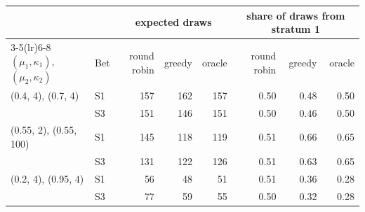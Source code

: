 \begin{tabular}{llrrrrrr}
\toprule
 & & \multicolumn{3}{c}{expected draws} & \multicolumn{3}{c}{share of draws from stratum 1}\\
\cmidrule(lr){3-5}\cmidrule(lr){6-8}
$(\mu_1,\kappa_1)$, $(\mu_2,\kappa_2)$ & Bet & round robin & greedy & oracle & round robin & greedy & oracle\\
\midrule
(0.4, 4), (0.7, 4) & S1 & 157 & 162 & 157 & 0.50 & 0.48 & 0.50\\
 & S3 & 151 & 146 & 151 & 0.50 & 0.46 & 0.50\\
\addlinespace
(0.55, 2), (0.55, 100) & S1 & 145 & 118 & 119 & 0.51 & 0.66 & 0.65\\
 & S3 & 131 & 122 & 126 & 0.51 & 0.63 & 0.65\\
\addlinespace
(0.2, 4), (0.95, 4) & S1 & 56 & 48 & 51 & 0.51 & 0.36 & 0.28\\
 & S3 & 77 & 59 & 55 & 0.50 & 0.32 & 0.28\\
\bottomrule
\end{tabular}
